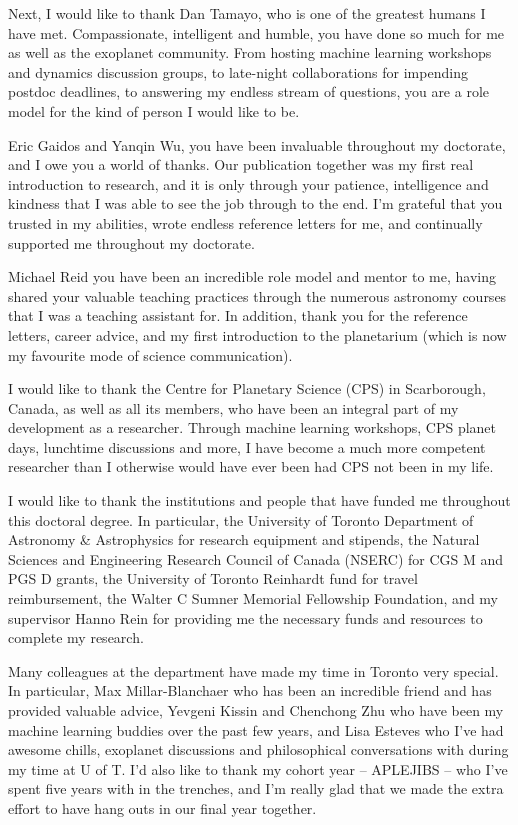 \documentclass[letterpaper]{ut-thesis} %
\begin{document}
\begin{preliminary}
\begin{acknowledgements}
Next, I would like to thank Dan Tamayo, who is one of the greatest humans I have met. 
Compassionate, intelligent and humble, you have done so much for me as well as the exoplanet community. 
From hosting machine learning workshops and dynamics discussion groups, to late-night collaborations for impending postdoc deadlines, to answering my endless stream of questions, you are a role model for the kind of person I would like to be. 

Eric Gaidos and Yanqin Wu, you have been invaluable throughout my doctorate, and I owe you a world of thanks. 
Our publication together was my first real introduction to research, and it is only through your patience, intelligence and kindness that I was able to see the job through to the end. 
I'm grateful that you trusted in my abilities, wrote endless reference letters for me, and continually supported me throughout my doctorate.

Michael Reid you have been an incredible role model and mentor to me, having shared your valuable teaching practices through the numerous astronomy courses that I was a teaching assistant for. 
In addition, thank you for the reference letters, career advice, and my first introduction to the planetarium (which is now my favourite mode of science communication).

I would like to thank the Centre for Planetary Science (CPS) in Scarborough, Canada, as well as all its members, who have been an integral part of my development as a researcher. 
Through machine learning workshops, CPS planet days, lunchtime discussions and more, I have become a much more competent researcher than I otherwise would have ever been had CPS not been in my life. 

I would like to thank the institutions and people that have funded me throughout this doctoral degree. 
In particular, the University of Toronto Department of Astronomy \& Astrophysics for research equipment and stipends, the Natural Sciences and Engineering Research Council of Canada (NSERC) for CGS M and PGS D grants, the University of Toronto Reinhardt fund for travel reimbursement, the Walter C Sumner Memorial Fellowship Foundation, and my supervisor Hanno Rein for providing me the necessary funds and resources to complete my research. 

Many colleagues at the department have made my time in Toronto very special. 
In particular, Max Millar-Blanchaer who has been an incredible friend and has provided valuable advice, Yevgeni Kissin and Chenchong Zhu who have been my machine learning buddies over the past few years, and Lisa Esteves who I've had awesome chills, exoplanet discussions and philosophical conversations with during my time at U of T.
I'd also like to thank my cohort year -- APLEJIBS -- who I've spent five years with in the trenches, and I'm really glad that we made the extra effort to have hang outs in our final year together. 


\end{acknowledgements}
\end{preliminary}
\end{document}

